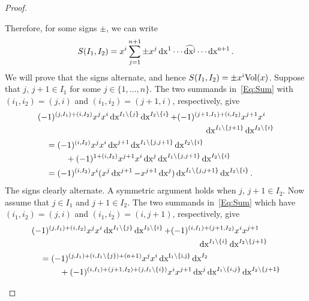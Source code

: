 \documentclass[\MainFolder/Text.tex]{subfiles}
\begin{document}
\begin{proof}
\begin{description}[font=\normalfont\itshape]
Therefore, for some signs $\pm$, we can write
\begin{equation*} \label{Eq:AlternatingSum}
S(I_1,I_2) = x^i \sum_{j=1}^{n+1}  \pm  x^j \operatorname{dx^1} \dotsm \widehat{\operatorname{dx^j}} \dotsm \operatorname{dx^{n+1}}.
\end{equation*}
%
We will prove that the signs alternate, and hence $S(I_1,I_2)= \pm x^i \mathrm{Vol}(x)$.
Suppose that $j$, $j+1 \in I_{1}$ for some $j\in \{1,\ldots,n\}$.
The two summands in~\eqref{Eq:Sum} with $(i_1, i_2)=(j, i)$ and $(i_1, i_2)= (j+1,i)$, respectively, give
\begin{align*}
& \begin{multlined}[t](-1)^{(j,I_1) + (i,I_2)} x^{j} x^{i} \Diff{x}^{I_1\backslash\{j\}} \Diff{x}^{I_2\backslash\{i\}} + (-1)^{(j+1,I_1) + (i,I_2)} x^{j+1} x^{i} \\ \Diff{x}^{I_1\backslash\{j+1\}}\Diff{x}^{I_2\backslash\{i\}} \end{multlined}
\\ &\quad= \begin{multlined}[t] (-1)^{(i,I_2)} x^{j} x^{i} \Diff{x}^{j+1}\Diff{x}^{I_1\backslash\{j, j+1\}} \Diff{x}^{I_2\backslash\{i\}}  \\ {}+ (-1)^{1 + (i,I_2)} x^{j+1} x^{i} \Diff{x}^j \Diff{x}^{I_1\backslash\{j, j+1\}} \Diff{x}^{I_2\backslash\{i\}} \end{multlined} \\
&\quad = (-1)^{(i,I_2)}x^i (x^j \Diff{x}^{j+1} - x^{j+1} \Diff{x}^j) \Diff{x}^{I_1\backslash\{j, j+1\}} \Diff{x}^{I_2\backslash\{i\}}.
\end{align*}
The signs clearly alternate.
A symmetric argument holds when $j$, $j+1\in I_2$.
Now assume that $j \in I_1$ and $j+1\in I_2$.
The two summands in~\eqref{Eq:Sum} which have $(i_1, i_2)=(j,i)$ and $(i_1, i_2) = (i,j+1)$, respectively, give
\begin{align*}
& \begin{multlined}[t] (-1)^{(j,I_1)+(i,I_2)} x^j x^i \Diff{x}^{I_1\backslash\{j\}}\Diff{x}^{I_2\backslash\{i\}} + (-1)^{(i,I_1) + (j+1,I_2)} x^i x^{j+1} \\ \Diff{x}^{I_1\backslash\{i\}}\Diff{x}^{I_2\backslash\{j+1\}} \end{multlined}\\
&\quad=\begin{multlined}[t]
(-1)^{(j,I_1)+(i,I_1\backslash\{j\}) + (a + 1)} x^j x^i \Diff{x^{I_1\backslash\{i, j\}}}\Diff{x}^{I_2} \\ {}+ (-1)^{(i,I_1) + (j+1,I_2) + (j,I_1\backslash\{i\})} x^i x^{j+1} \Diff{x}^j \Diff{x}^{I_1\backslash\{i, j\}} \Diff{x}^{I_2\backslash\{j+1\}}

\end{multlined}
\end{align*}
\end{description}
\end{proof}
\end{document}

